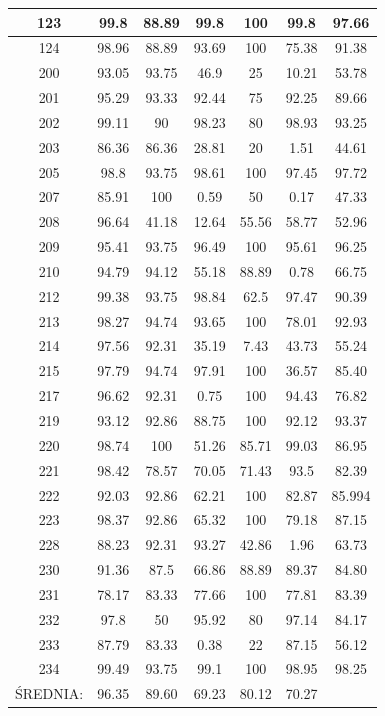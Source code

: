 \documentclass[10pt,a4paper]{article}
\begin{document}
\begin{table}
{\begin{tabular}{ | c | c | c | c | c | c | c |}
	123 & 99.8 & 88.89 & 99.8 & 100 & 99.8 & 97.66 \\ \hline
	124 & 98.96 & 88.89 & 93.69 & 100 & 75.38 & 91.38 \\ \hline
	200 & 93.05 & 93.75 & 46.9 & 25 & 10.21 & 53.78 \\ \hline
	201 & 95.29 & 93.33 & 92.44 & 75 & 92.25 & 89.66 \\ \hline
	202 & 99.11 & 90 & 98.23 & 80 & 98.93 & 93.25 \\ \hline
	203 & 86.36 & 86.36 & 28.81 & 20 & 1.51 & 44.61 \\ \hline
	205 & 98.8 & 93.75 & 98.61 & 100 & 97.45 & 97.72 \\ \hline
	207 & 85.91 & 100 & 0.59 & 50 & 0.17 & 47.33 \\ \hline
	208 & 96.64 & 41.18 & 12.64 & 55.56 & 58.77 & 52.96 \\ \hline
	209 & 95.41 & 93.75 & 96.49 & 100 & 95.61 & 96.25 \\ \hline
	210 & 94.79 & 94.12 & 55.18 & 88.89 & 0.78 & 66.75 \\ \hline
	212 & 99.38 & 93.75 & 98.84 & 62.5 & 97.47 & 90.39 \\ \hline
	213 & 98.27 & 94.74 & 93.65 & 100 & 78.01 & 92.93 \\ \hline
	214 & 97.56 & 92.31 & 35.19 & 7.43 & 43.73 & 55.24 \\ \hline
	215 & 97.79 & 94.74 & 97.91 & 100 & 36.57 & 85.40 \\ \hline
	217 & 96.62 & 92.31 & 0.75 & 100 & 94.43 & 76.82 \\ \hline
	219 & 93.12 & 92.86 & 88.75 & 100 & 92.12 & 93.37 \\ \hline
	220 & 98.74 & 100 & 51.26 & 85.71 & 99.03 & 86.95 \\ \hline
	221 & 98.42 & 78.57 & 70.05 & 71.43 & 93.5 & 82.39 \\ \hline
	222 & 92.03 & 92.86 & 62.21 & 100 & 82.87 & 85.994 \\ \hline
	223 & 98.37 & 92.86 & 65.32 & 100 & 79.18 & 87.15 \\ \hline
	228 & 88.23 & 92.31 & 93.27 & 42.86 & 1.96 & 63.73 \\ \hline
	230 & 91.36 & 87.5 & 66.86 & 88.89 & 89.37 & 84.80 \\ \hline
	231 & 78.17 & 83.33 & 77.66 & 100 & 77.81 & 83.39 \\ \hline
	232 & 97.8 & 50 & 95.92 & 80 & 97.14 & 84.17 \\ \hline
	233 & 87.79 & 83.33 & 0.38 & 22 & 87.15 & 56.12 \\ \hline
	234 & 99.49 & 93.75 & 99.1 & 100 & 98.95 & 98.25 \\ \hline
	ŚREDNIA: & 96.35 & 89.60 & 69.23 & 80.12 & 70.27  \\ \hline
\end{tabular}
}

\end{table}
\end{document}
